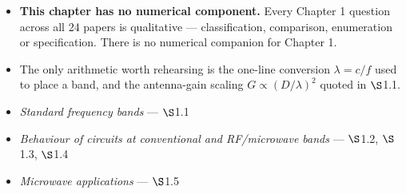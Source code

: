\begin{itemize}
  \item \textbf{This chapter has no numerical component.} Every Chapter 1 question across all 24 papers is qualitative --- classification, comparison, enumeration or specification. There is no numerical companion for Chapter 1.
  \item The only arithmetic worth rehearsing is the one-line conversion $\lambda = c/f$ used to place a band, and the antenna-gain scaling $G \propto (D/\lambda)^2$ quoted in $\S$1.1.
\end{itemize}

\begin{itemize}
  \item \textit{Standard frequency bands} --- $\S$1.1 \checkmark
  \item \textit{Behaviour of circuits at conventional and RF/microwave bands} --- $\S$1.2, $\S$1.3, $\S$1.4 \checkmark
  \item \textit{Microwave applications} --- $\S$1.5 \checkmark
\end{itemize}

\vspace{2pt}
